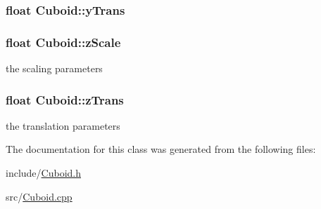 \hypertarget{classCuboid_a56d911db535a33deecf6f73d6d6c2c5e}{
\subsubsection[{y\-Trans}]{\setlength{\rightskip}{0pt plus 5cm}float {\bf \-Cuboid\-::y\-Trans}}}\label{classCuboid_a56d911db535a33deecf6f73d6d6c2c5e}
\hypertarget{classCuboid_a8f807289bd2c0f2c649cf3f2375c3ae9}{
\subsubsection[{z\-Scale}]{\setlength{\rightskip}{0pt plus 5cm}float {\bf \-Cuboid\-::z\-Scale}}}\label{classCuboid_a8f807289bd2c0f2c649cf3f2375c3ae9}


the scaling parameters 

\hypertarget{classCuboid_a213e14dd4c1cde9808d86d306ae981db}{
\subsubsection[{z\-Trans}]{\setlength{\rightskip}{0pt plus 5cm}float {\bf \-Cuboid\-::z\-Trans}}}\label{classCuboid_a213e14dd4c1cde9808d86d306ae981db}


the translation parameters 



\-The documentation for this class was generated from the following files\-:\begin{DoxyCompactItemize}
\item 
include/\hyperlink{Cuboid_8h}{\-Cuboid.\-h}\item 
src/\hyperlink{Cuboid_8cpp}{\-Cuboid.\-cpp}\end{DoxyCompactItemize}

